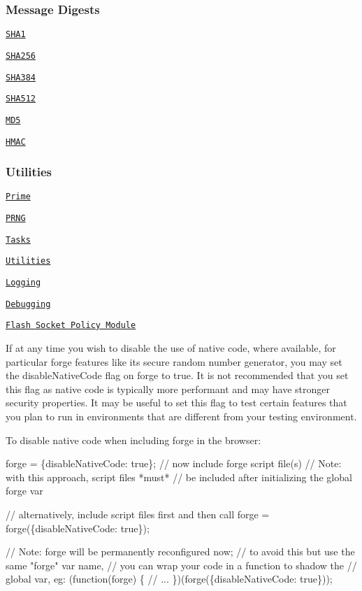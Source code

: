 \subsubsection*{Message Digests}


\begin{DoxyItemize}
\item \href{#sha1}{\tt S\+H\+A1}
\item \href{#sha256}{\tt S\+H\+A256}
\item \href{#sha384}{\tt S\+H\+A384}
\item \href{#sha512}{\tt S\+H\+A512}
\item \href{#md5}{\tt M\+D5}
\item \href{#hmac}{\tt H\+M\+AC}
\end{DoxyItemize}

\subsubsection*{Utilities}


\begin{DoxyItemize}
\item \href{#prime}{\tt Prime}
\item \href{#prng}{\tt P\+R\+NG}
\item \href{#task}{\tt Tasks}
\item \href{#util}{\tt Utilities}
\item \href{#log}{\tt Logging}
\item \href{#debug}{\tt Debugging}
\item \href{#fsp}{\tt Flash Socket Policy Module} 


\end{DoxyItemize}

If at any time you wish to disable the use of native code, where available, for particular forge features like its secure random number generator, you may set the {\ttfamily disable\+Native\+Code} flag on {\ttfamily forge} to {\ttfamily true}. It is not recommended that you set this flag as native code is typically more performant and may have stronger security properties. It may be useful to set this flag to test certain features that you plan to run in environments that are different from your testing environment.

To disable native code when including forge in the browser\+:


\begin{DoxyCode}
forge = \{disableNativeCode: true\};
// now include forge script file(s)
// Note: with this approach, script files *must*
// be included after initializing the global forge var

// alternatively, include script files first and then call
forge = forge(\{disableNativeCode: true\});

// Note: forge will be permanently reconfigured now;
// to avoid this but use the same "forge" var name,
// you can wrap your code in a function to shadow the
// global var, eg:
(function(forge) \{
  // ...
\})(forge(\{disableNativeCode: true\}));
\end{DoxyCode}


